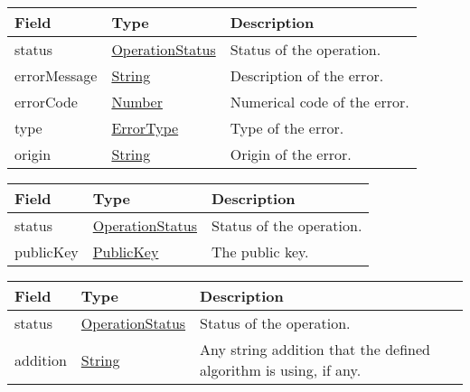 \documentclass[a4paper]{arrowhead}
\newcommand{\pref}[1]{{\textcolor{ArrowheadGrey}{\hyperref[sec:model:primitives:#1]{#1}}}}
\begin{document}

\begin{table}[ht!]
\begin{tabularx}{\textwidth}{| p{4.25cm} | p{3.5cm} | X |} \hline
\rowcolor{gray!33} Field & Type      & Description \\ \hline
status & \pref{OperationStatus} & Status of the operation. \\ \hline
errorMessage & \pref{String} & Description of the error. \\ \hline
errorCode &\pref{Number}  & Numerical code of the error. \\ \hline
type & \pref{ErrorType} & Type of the error. \\ \hline
origin & \pref{String} & Origin of the error. \\ \hline
\end{tabularx}
\end{table}


\begin{table}[ht!]
\begin{tabularx}{\textwidth}{| p{4.25cm} | p{4.5cm} | X |} \hline
\rowcolor{gray!33} Field & Type & Description \\ \hline
status & \pref{OperationStatus} & Status of the operation. \\ \hline
publicKey & \pref{PublicKey} & The public key. \\ \hline
\end{tabularx}
\end{table}

\clearpage


\begin{table}[ht!]
\begin{tabularx}{\textwidth}{| p{4.25cm} | p{4.5cm} | X |} \hline
\rowcolor{gray!33} Field & Type & Description \\ \hline
status & \pref{OperationStatus} & Status of the operation. \\ \hline
addition & \pref{String} & Any string addition that the defined algorithm is using, if any. \\ \hline
\end{tabularx}
\end{table}

\end{document}
